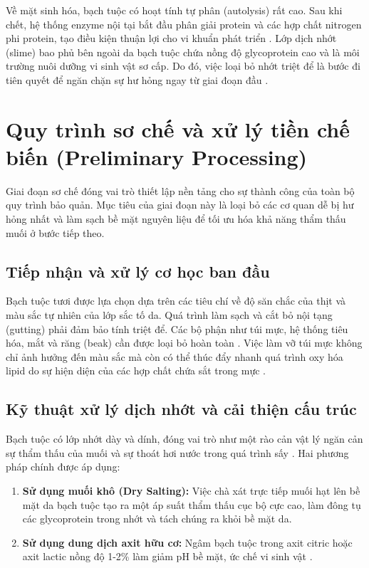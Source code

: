 \documentclass[12pt,a4paper]{report}
\begin{document}
Về mặt sinh hóa, bạch tuộc có hoạt tính tự phân (autolysis) rất cao. Sau khi chết, hệ thống enzyme nội tại bắt đầu phân giải protein và các hợp chất nitrogen phi protein, tạo điều kiện thuận lợi cho vi khuẩn phát triển \cite{octopus_oregano}. Lớp dịch nhớt (slime) bao phủ bên ngoài da bạch tuộc chứa nồng độ glycoprotein cao và là môi trường nuôi dưỡng vi sinh vật sơ cấp. Do đó, việc loại bỏ nhớt triệt để là bước đi tiên quyết để ngăn chặn sự hư hỏng ngay từ giai đoạn đầu \cite{squid_acids}.

\section{Quy trình sơ chế và xử lý tiền chế biến (Preliminary Processing)}

Giai đoạn sơ chế đóng vai trò thiết lập nền tảng cho sự thành công của toàn bộ quy trình bảo quản. Mục tiêu của giai đoạn này là loại bỏ các cơ quan dễ bị hư hỏng nhất và làm sạch bề mặt nguyên liệu để tối ưu hóa khả năng thẩm thấu muối ở bước tiếp theo.

\subsection{Tiếp nhận và xử lý cơ học ban đầu}

Bạch tuộc tươi được lựa chọn dựa trên các tiêu chí về độ săn chắc của thịt và màu sắc tự nhiên của lớp sắc tố da. Quá trình làm sạch và cắt bỏ nội tạng (gutting) phải đảm bảo tính triệt để. Các bộ phận như túi mực, hệ thống tiêu hóa, mắt và răng (beak) cần được loại bỏ hoàn toàn \cite{octopus_methods}. Việc làm vỡ túi mực không chỉ ảnh hưởng đến màu sắc mà còn có thể thúc đẩy nhanh quá trình oxy hóa lipid do sự hiện diện của các hợp chất chứa sắt trong mực \cite{lipid_storage}.

\subsection{Kỹ thuật xử lý dịch nhớt và cải thiện cấu trúc}

Bạch tuộc có lớp nhớt dày và dính, đóng vai trò như một rào cản vật lý ngăn cản sự thẩm thấu của muối và sự thoát hơi nước trong quá trình sấy \cite{squid_acids}. Hai phương pháp chính được áp dụng:

\begin{enumerate}
	\item \textbf{Sử dụng muối khô (Dry Salting):} Việc chà xát trực tiếp muối hạt lên bề mặt da bạch tuộc tạo ra một áp suất thẩm thấu cục bộ cực cao, làm đông tụ các glycoprotein trong nhớt và tách chúng ra khỏi bề mặt da.
	\item \textbf{Sử dụng dung dịch axit hữu cơ:} Ngâm bạch tuộc trong axit citric hoặc axit lactic nồng độ 1-2\% làm giảm pH bề mặt, ức chế vi sinh vật \cite{squid_acids}.
\end{enumerate}
\end{document}
